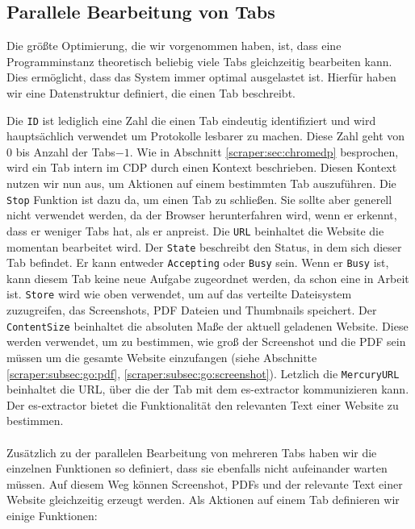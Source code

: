 \subsection{Parallele Bearbeitung von Tabs}
Die größte Optimierung, die wir vorgenommen haben, ist, dass eine Programminstanz theoretisch beliebig viele Tabs gleichzeitig bearbeiten kann. Dies ermöglicht, dass das System immer optimal ausgelastet ist. Hierfür haben wir eine Datenstruktur definiert, die einen Tab beschreibt. 
Die \verb|ID| ist lediglich eine Zahl die einen Tab eindeutig identifiziert und wird hauptsächlich verwendet um Protokolle lesbarer zu machen. Diese Zahl geht von $0$ bis Anzahl der Tabs$-1$. 
Wie in Abschnitt \ref{scraper:sec:chromedp} besprochen, wird ein Tab intern im CDP durch einen Kontext beschrieben. Diesen Kontext nutzen wir nun aus, um Aktionen auf einem bestimmten Tab auszuführen. Die \verb|Stop| Funktion ist dazu da, um einen Tab zu schließen. Sie sollte aber generell nicht verwendet werden, da der Browser herunterfahren wird, wenn er erkennt, dass er weniger Tabs hat, als er anpreist. Die \verb|URL| beinhaltet die Website die momentan bearbeitet wird. Der \verb|State| beschreibt den Status, in dem sich dieser Tab befindet. Er kann entweder \verb|Accepting| oder \verb|Busy| sein. Wenn er \verb|Busy| ist, kann diesem Tab keine neue Aufgabe zugeordnet werden, da schon eine in Arbeit ist. \verb|Store| wird wie oben verwendet, um auf das verteilte Dateisystem zuzugreifen, das Screenshots, PDF Dateien und Thumbnails speichert. Der \verb|ContentSize| beinhaltet die absoluten Maße der aktuell geladenen Website. Diese werden verwendet, um zu bestimmen, wie groß der Screenshot und die PDF sein müssen um die gesamte Website einzufangen (siehe Abschnitte \ref{scraper:subsec:go:pdf}, \ref{scraper:subsec:go:screenshot}). Letzlich die \verb|MercuryURL| beinhaltet die URL, über die der Tab mit dem es-extractor kommunizieren kann. Der es-extractor bietet die Funktionalität den relevanten Text einer Website zu bestimmen. \\ \\ Zusätzlich zu der parallelen Bearbeitung von mehreren Tabs haben wir die einzelnen Funktionen so definiert, dass sie ebenfalls nicht aufeinander warten müssen. Auf diesem Weg können Screenshot, PDFs und der relevante Text einer Website gleichzeitig erzeugt werden. Als Aktionen auf einem Tab definieren wir einige Funktionen:

